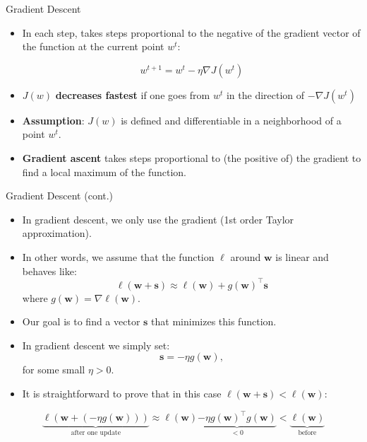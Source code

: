 \documentclass[serif, aspectratio=169]{beamer}
\begin{document}
    \begin{frame}{Gradient Descent}

        \begin{itemize}
            \item In each step, takes steps proportional to the negative of the gradient vector of the function at the current point \( w^t \):

            \[
                w^{t+1} = w^t - \eta \nabla J(w^t)
            \]

            \item \( J(w) \) \textbf{decreases fastest} if one goes from \( w^t \) in the direction of \( -\nabla J(w^t) \)

            \item \textbf{Assumption}: \( J(w) \) is defined and differentiable in a neighborhood of a point \( w^t \).
            \item \textbf{Gradient ascent} takes steps proportional to (the positive of) the gradient to find a local maximum of the function.


        \end{itemize}

    \end{frame}


    \begin{frame}{Gradient Descent (cont.)}
        \begin{itemize}
            \item In gradient descent, we only use the gradient (1st order Taylor approximation).
            \item In other words, we assume that the function $\ell$ around $\mathbf{w}$ is linear and behaves like:
            \[
                \ell(\mathbf{w} + \mathbf{s}) \approx \ell(\mathbf{w}) + g(\mathbf{w})^{\top} \mathbf{s}
            \]
            where $g(\mathbf{w}) = \nabla \ell(\mathbf{w})$.
            \item Our goal is to find a vector $\mathbf{s}$ that minimizes this function.
            \item In gradient descent we simply set:
            \[
                \mathbf{s} = -\eta g(\mathbf{w}),
            \]
            for some small $\eta > 0$.
            \item It is straightforward to prove that in this case $\ell(\mathbf{w} + \mathbf{s}) < \ell(\mathbf{w})$:
        \end{itemize}

        \vspace{0.0cm}
        \begin{equation*}
            \underbrace{\ell(\mathbf{w} + (-\eta g(\mathbf{w})))}_{\text{after one update}}
            \approx
            \ell(\mathbf{w}) \underbrace{- \eta g(\mathbf{w})^{\top} g(\mathbf{w})}_{<0}
            <
            \underbrace{\ell(\mathbf{w})}_{\text{before}}
        \end{equation*}
    \end{frame}
\end{document}
